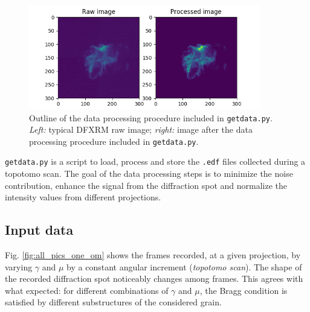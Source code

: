 \documentclass[11pt]{scrartcl}
\begin{document}
\begin{figure}[h]
    \centering
    \label{fig:img_array}
    \includegraphics[width=0.9\textwidth]{Raw_processed}
    \caption{Outline of the data processing procedure included in {\texttt{getdata.py}}. {\emph{Left:}} typical {\footnotesize{DFXRM}} raw image; {\emph{right:}} image after the data processing procedure included in {\texttt{getdata.py}}.}
    \label{fig:raw_processed}
\end{figure}

{\texttt{getdata.py}} is a script to load, process and store the {\texttt{.edf}} files collected during a topotomo scan. The goal of the data processing steps is to minimize the noise contribution, enhance the signal from the diffraction spot and normalize the intensity values from different projections.

\subsection{Input data}

Fig. \ref{fig:all_pics_one_om} shows the frames recorded, at a given projection, by varying $\gamma$ and $\mu$ by a constant angular increment ({\emph{topotomo scan}}). The shape of the recorded diffraction spot noticeably changes among frames. This agrees with what expected: for different combinations of $\gamma$ and $\mu$, the Bragg condition is satisfied by different substructures of the considered grain.
\end{document}
